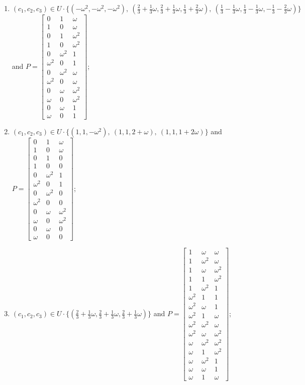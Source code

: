 \begin{enumerate}
\item[(f77)\,\newitem] $(c_1,c_2,c_3)\in U\cdot\{(-\omega^2,-\omega^2,-\omega^2),\allowbreak\ (\tfrac{2}{3}+\tfrac{1}{3}\omega,\tfrac{2}{3}+\tfrac{1}{3}\omega,\tfrac{1}{3}+\tfrac{2}{3}\omega),\allowbreak\ (\tfrac{1}{3}-\tfrac{1}{3}\omega,\tfrac{1}{3}-\tfrac{1}{3}\omega,-\tfrac{1}{3}-\tfrac{2}{3}\omega)\}$ and $P=\begin{bmatrix}0&1&\omega\\1&0&\omega\\0&1&\omega^2\\1&0&\omega^2\\0&\omega^2&1\\\omega^2&0&1\\0&\omega^2&\omega\\\omega^2&0&\omega\\0&\omega&\omega^2\\\omega&0&\omega^2\\0&\omega&1\\\omega&0&1\end{bmatrix}$;
\item[(f78)\,\newitem] $(c_1,c_2,c_3)\in U\cdot\{(1,1,-\omega^2),\allowbreak\ (1,1,2+\omega),\allowbreak\ (1,1,1+2\omega)\}$ and $P=\begin{bmatrix}0&1&\omega\\1&0&\omega\\0&1&0\\1&0&0\\0&\omega^2&1\\\omega^2&0&1\\0&\omega^2&0\\\omega^2&0&0\\0&\omega&\omega^2\\\omega&0&\omega^2\\0&\omega&0\\\omega&0&0\end{bmatrix}$;
\item[(f79)\,\newitem] $(c_1,c_2,c_3)\in U\cdot\{(\tfrac{2}{3}+\tfrac{1}{3}\omega,\tfrac{2}{3}+\tfrac{1}{3}\omega,\tfrac{2}{3}+\tfrac{1}{3}\omega)\}$ and $P=\begin{bmatrix}1&\omega&\omega\\1&\omega^2&\omega\\1&\omega&\omega^2\\1&1&\omega^2\\1&\omega^2&1\\\omega^2&1&1\\\omega^2&\omega&1\\\omega^2&1&\omega\\\omega^2&\omega^2&\omega\\\omega^2&\omega&\omega^2\\\omega&\omega^2&\omega^2\\\omega&1&\omega^2\\\omega&\omega^2&1\\\omega&\omega&1\\\omega&1&\omega\end{bmatrix}$;

\end{enumerate}
